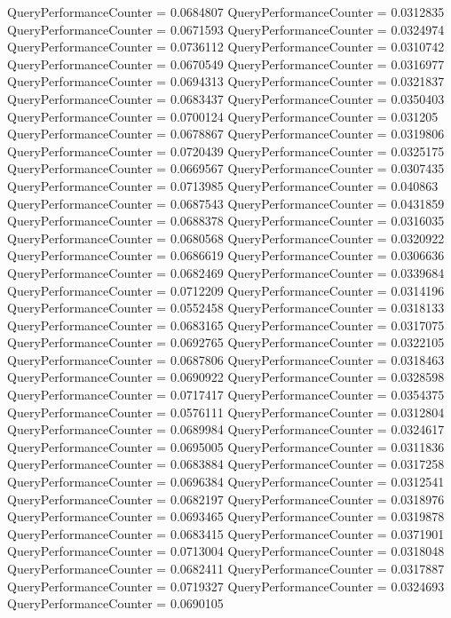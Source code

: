 \documentclass[9pt]{article}
\theoremstyle{plain}
\theoremstyle{definition}
\theoremstyle{remark}
\numberwithin{equation}{section}
\begin{document}
QueryPerformanceCounter  =  0.0684807
QueryPerformanceCounter  =  0.0312835
QueryPerformanceCounter  =  0.0671593
QueryPerformanceCounter  =  0.0324974
QueryPerformanceCounter  =  0.0736112
QueryPerformanceCounter  =  0.0310742
QueryPerformanceCounter  =  0.0670549
QueryPerformanceCounter  =  0.0316977
QueryPerformanceCounter  =  0.0694313
QueryPerformanceCounter  =  0.0321837
QueryPerformanceCounter  =  0.0683437
QueryPerformanceCounter  =  0.0350403
QueryPerformanceCounter  =  0.0700124
QueryPerformanceCounter  =  0.031205
QueryPerformanceCounter  =  0.0678867
QueryPerformanceCounter  =  0.0319806
QueryPerformanceCounter  =  0.0720439
QueryPerformanceCounter  =  0.0325175
QueryPerformanceCounter  =  0.0669567
QueryPerformanceCounter  =  0.0307435
QueryPerformanceCounter  =  0.0713985
QueryPerformanceCounter  =  0.040863
QueryPerformanceCounter  =  0.0687543
QueryPerformanceCounter  =  0.0431859
QueryPerformanceCounter  =  0.0688378
QueryPerformanceCounter  =  0.0316035
QueryPerformanceCounter  =  0.0680568
QueryPerformanceCounter  =  0.0320922
QueryPerformanceCounter  =  0.0686619
QueryPerformanceCounter  =  0.0306636
QueryPerformanceCounter  =  0.0682469
QueryPerformanceCounter  =  0.0339684
QueryPerformanceCounter  =  0.0712209
QueryPerformanceCounter  =  0.0314196
QueryPerformanceCounter  =  0.0552458
QueryPerformanceCounter  =  0.0318133
QueryPerformanceCounter  =  0.0683165
QueryPerformanceCounter  =  0.0317075
QueryPerformanceCounter  =  0.0692765
QueryPerformanceCounter  =  0.0322105
QueryPerformanceCounter  =  0.0687806
QueryPerformanceCounter  =  0.0318463
QueryPerformanceCounter  =  0.0690922
QueryPerformanceCounter  =  0.0328598
QueryPerformanceCounter  =  0.0717417
QueryPerformanceCounter  =  0.0354375
QueryPerformanceCounter  =  0.0576111
QueryPerformanceCounter  =  0.0312804
QueryPerformanceCounter  =  0.0689984
QueryPerformanceCounter  =  0.0324617
QueryPerformanceCounter  =  0.0695005
QueryPerformanceCounter  =  0.0311836
QueryPerformanceCounter  =  0.0683884
QueryPerformanceCounter  =  0.0317258
QueryPerformanceCounter  =  0.0696384
QueryPerformanceCounter  =  0.0312541
QueryPerformanceCounter  =  0.0682197
QueryPerformanceCounter  =  0.0318976
QueryPerformanceCounter  =  0.0693465
QueryPerformanceCounter  =  0.0319878
QueryPerformanceCounter  =  0.0683415
QueryPerformanceCounter  =  0.0371901
QueryPerformanceCounter  =  0.0713004
QueryPerformanceCounter  =  0.0318048
QueryPerformanceCounter  =  0.0682411
QueryPerformanceCounter  =  0.0317887
QueryPerformanceCounter  =  0.0719327
QueryPerformanceCounter  =  0.0324693
QueryPerformanceCounter  =  0.0690105
\end{document}
